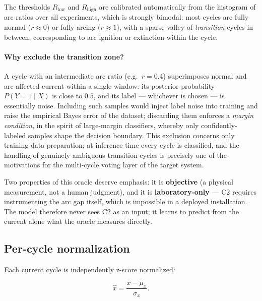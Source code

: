The thresholds $R_{\text{low}}$ and $R_{\text{high}}$ are calibrated automatically from the histogram of arc ratios over all experiments, which is strongly bimodal: most cycles are fully normal ($r \approx 0$) or fully arcing ($r \approx 1$), with a sparse valley of \emph{transition} cycles in between, corresponding to arc ignition or extinction within the cycle.

\paragraph{Why exclude the transition zone?} A cycle with an intermediate arc ratio (e.g.\ $r = 0.4$) superimposes normal and arc-affected current within a single window: its posterior probability $P(Y{=}1 \mid X)$ is close to $0.5$, and its label --- whichever is chosen --- is essentially noise. Including such samples would inject label noise into training and raise the empirical Bayes error of the dataset; discarding them enforces a \emph{margin condition}, in the spirit of large-margin classifiers, whereby only confidently-labeled samples shape the decision boundary. This exclusion concerns only training data preparation; at inference time every cycle is classified, and the handling of genuinely ambiguous transition cycles is precisely one of the motivations for the multi-cycle voting layer of the target system.

\medskip

Two properties of this oracle deserve emphasis: it is \textbf{objective} (a physical measurement, not a human judgment), and it is \textbf{laboratory-only} --- C2 requires instrumenting the arc gap itself, which is impossible in a deployed installation. The model therefore never sees C2 as an input; it learns to predict from the current alone what the oracle measures directly.

\subsection{Per-cycle normalization}
\label{sec:normalization}

Each current cycle is independently z-score normalized:

\begin{equation}
\hat{x} = \frac{x - \mu_x}{\sigma_x}.
\label{eq:zscore}
\end{equation}

